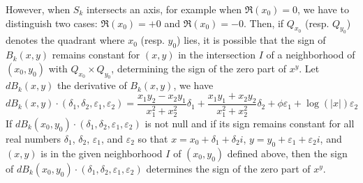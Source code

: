 \documentclass {article}
\renewcommand {\epsilon}{\varepsilon}
\begin{document}
However, when $S_k$ intersects an axis, for example when $\Re(x_0) = 0$, we
have to distinguish two cases: $\Re(x_0) = +0$ and $\Re(x_0) = -0$.
Then, if $Q_{x_0}$ (resp. $Q_{y_0}$) denotes the quadrant where $x_0$
(resp. $y_0$) lies, it is possible that the sign of $B_k(x,y)$ remains
constant for $(x,y)$ in the intersection $I$ of a neighborhood of $(x_0, y_0)$
with $Q_{x_0}\times Q_{y_0}$, determining the sign of the zero part of $x^y$.
Let $dB_k(x,y)$ the derivative of $B_k(x, y)$, we have
\begin {equation}
  \label {eqn:BkDerivative}
  dB_k(x, y)\cdot(\delta_1, \delta_2, \epsilon_1, \epsilon_2) =
  \frac{x_1y_2-x_2y_1}{x_1^2+x_2^2}\delta_1 +
  \frac{x_1y_1+x_2y_2}{x_1^2+x_2^2}\delta_2 +
  \phi\epsilon_1 +
  \log(|x|) \epsilon_2
\end {equation}
If $dB_k(x_0, y_0)\cdot(\delta_1, \delta_2, \epsilon_1, \epsilon_2)$ is not
null and if its sign remains constant for all real numbers $\delta_1$,
$\delta_2$, $\epsilon_1$, and $\epsilon_2$ so that $x = x_0 + \delta_1 +
\delta_2i$, $y = y_0 +\epsilon_1 + \epsilon_2i$, and $(x,y)$ is in the given
neighborhood $I$ of $(x_0, y_0)$ defined above, then the sign of $dB_k(x_0,
y_0)\cdot(\delta_1, \delta_2, \epsilon_1, \epsilon_2)$ determines the sign of
the zero part of $x^y$.
\end{document}
